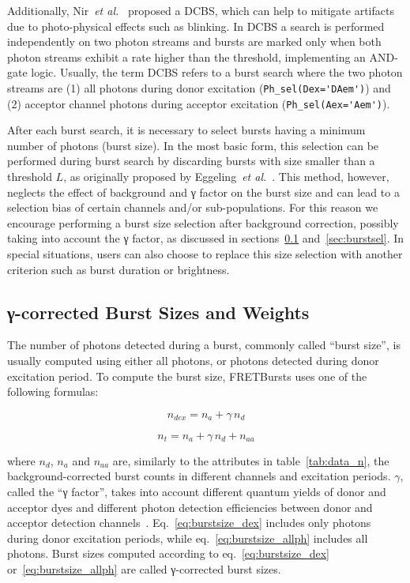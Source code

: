 Additionally, Nir~\textit{et al.}~\cite{Nir_2006} proposed a DCBS, which can help 
to mitigate artifacts due to photo-physical effects such as blinking. 
In DCBS a search is performed independently on two photon streams 
and bursts are marked only when both photon streams exhibit a rate higher than 
the threshold, implementing an AND-gate logic.
Usually, the term DCBS refers to a burst search where the two photon streams
are (1) all photons
during donor excitation (\verb|Ph_sel(Dex='DAem')|) and (2) acceptor channel photons
during acceptor
excitation (\verb|Ph_sel(Aex='Aem')|).

After each burst search, it is necessary to select
bursts having a minimum number of photons (burst size). In the most
basic form, this selection can be performed during burst search by discarding
bursts with size smaller than a threshold $L$, as originally proposed by
Eggeling~\textit{et al.}~\cite{Eggeling_1998}.
This method, however, neglects the effect
of background and γ factor on the burst size and can lead to a selection
bias of certain channels and/or sub-populations.
For this reason we encourage performing a burst size selection after background
correction, possibly taking into account the γ factor, as discussed in
sections~\ref{sec:burstsizeweights} and~\ref{sec:burstsel}.
In special situations, users can also choose to replace this size selection
with another criterion such as burst duration or brightness.

\subsection{γ-corrected Burst Sizes and Weights}
\label{sec:burstsizeweights}

The number of photons detected during a burst, commonly called ``burst size'',
is usually computed using either all photons, or photons detected 
during donor excitation period. To compute the burst size, FRETBursts uses 
one of the following formulas:

\begin{equation}
\label{eq:burstsize_dex}
n_{dex} = n_a + \gamma\,n_d 
\end{equation}

\begin{equation}
\label{eq:burstsize_allph}
n_t = n_a + \gamma\,n_d + n_{aa}
\end{equation}

\noindent where $n_d$, $n_a$ and $n_{aa}$ are, similarly to the attributes 
in table~\ref{tab:data_n}, the background-corrected
burst counts in different channels and excitation periods.
$\gamma$, called the ``γ factor'', takes into account
different quantum yields of donor and acceptor dyes and different
photon detection efficiencies between donor and acceptor detection
channels~\cite{Lee_2005}.
Eq.~\ref{eq:burstsize_dex} includes only photons during donor excitation periods, 
while eq.~\ref{eq:burstsize_allph} includes all photons.
Burst sizes computed according to eq.~\ref{eq:burstsize_dex} 
or~\ref{eq:burstsize_allph} are called γ-corrected burst sizes.

